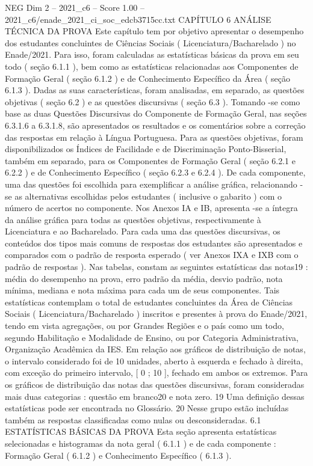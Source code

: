 \begin{textsample}{NEG Dim 2 – 2021\_c6 – Score 1.00 – 2021\_c6/enade\_2021\_ci\_soc\_edcb3715cc.txt}  \label{ex:f2_neg_257}
CAPÍTULO 6 ANÁLISE TÉCNICA DA PROVA Este capítulo tem por objetivo apresentar o desempenho dos estudantes concluintes de Ciências Sociais ( Licenciatura/Bacharelado ) no Enade/2021.
Para isso, foram calculadas as estatísticas básicas da prova em seu todo ( seção 6.1.1 ), bem como as estatísticas relacionadas aos Componentes de Formação Geral ( seção 6.1.2 ) e de Conhecimento Específico da Área ( seção 6.1.3 ).
Dadas as suas características, foram analisadas, em separado, as questões objetivas ( seção 6.2 ) e as questões discursivas ( seção 6.3 ).
Tomando -se como base as duas Questões Discursivas do Componente de Formação Geral, nas seções 6.3.1.6 a 6.3.1.8, são apresentados os resultados e os comentários sobre a correção das respostas em relação à Língua Portuguesa.
Para as questões objetivas, foram disponibilizados os Índices de Facilidade e de Discriminação Ponto-Bisserial, também em separado, para os Componentes de Formação Geral ( seção 6.2.1 e 6.2.2 ) e de Conhecimento Específico ( seção 6.2.3 e 6.2.4 ).
De cada componente, uma das questões foi escolhida para exemplificar a análise gráfica, relacionando -se as alternativas escolhidas pelos estudantes ( inclusive o gabarito ) com o número de acertos no componente.
Nos Anexos IA e IB, apresenta -se a íntegra da análise gráfica para todas as questões objetivas, respectivamente à Licenciatura e ao Bacharelado.
Para cada uma das questões discursivas, os conteúdos dos tipos mais comuns de respostas dos estudantes são apresentados e comparados com o padrão de resposta esperado ( ver Anexos IXA e IXB com o padrão de respostas ).
Nas tabelas, constam as seguintes estatísticas das notas19 : média do desempenho na prova, erro padrão da média, desvio padrão, nota mínima, mediana e nota máxima para cada um de seus componentes.
Tais estatísticas contemplam o total de estudantes concluintes da Área de Ciências Sociais ( Licenciatura/Bacharelado ) inscritos e presentes à prova do Enade/2021, tendo em vista agregações, ou por Grandes Regiões e o país como um todo, segundo Habilitação e Modalidade de Ensino, ou por Categoria Administrativa, Organização Acadêmica da IES.
Em relação aos gráficos de distribuição de notas, o intervalo considerado foi de 10 unidades, aberto à esquerda e fechado à direita, com exceção do primeiro intervalo, [ 0 ; 10 ], fechado em ambos os extremos.
Para os gráficos de distribuição das notas das questões discursivas, foram consideradas mais duas categorias : questão em branco20 e nota zero. 19 Uma definição dessas estatísticas pode ser encontrada no Glossário. 20 Nesse grupo estão incluídas também as respostas classificadas como nulas ou desconsideradas. 6.1 ESTATÍSTICAS BÁSICAS DA PROVA Esta seção apresenta estatísticas selecionadas e histogramas da nota geral ( 6.1.1 ) e de cada componente : Formação Geral ( 6.1.2 ) e Conhecimento Específico ( 6.1.3 ).

\end{textsample}
